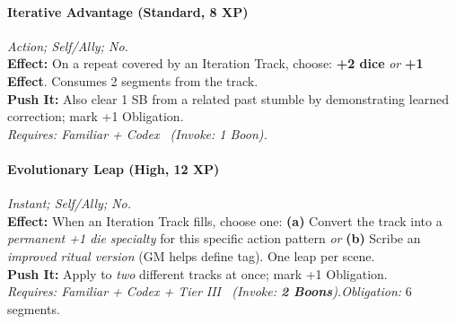 \paragraph{Iterative Advantage (Standard, 8 XP)} \emph{Action; Self/Ally; No.}\\
\textbf{Effect:} On a repeat covered by an Iteration Track, choose: \textbf{+2 dice} \emph{or} \textbf{+1 Effect}. Consumes 2 segments from the track.\\
\textbf{Push It:} Also clear 1 SB from a related past stumble by demonstrating learned correction; mark +1 Obligation.\\
\emph{Requires: Familiar + Codex \ (\textit{Invoke:} 1 Boon).}

\paragraph{Evolutionary Leap (High, 12 XP)} \emph{Instant; Self/Ally; No.}\\
\textbf{Effect:} When an Iteration Track fills, choose one: \textbf{(a)} Convert the track into a \emph{permanent +1 die} \textit{specialty} for this specific action pattern \emph{or} \textbf{(b)} Scribe an \emph{improved ritual version} (GM helps define tag). One leap per scene.\\
\textbf{Push It:} Apply to \emph{two} different tracks at once; mark +1 Obligation.\\
\emph{Requires: Familiar + Codex + Tier III \ (\textit{Invoke:} \textbf{2 Boons}).}\quad \emph{Obligation:} 6 segments.

